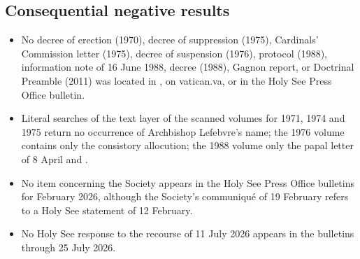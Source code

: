 \subsection*{Consequential negative results}

\begin{itemize}
\item No decree of erection (1970), decree of suppression (1975),
Cardinals' Commission letter (1975), decree of suspension (1976),
protocol (1988), information note of 16 June 1988, decree  (1988), Gagnon report, or Doctrinal Preamble (2011)
was located in , on vatican.va, or in the
Holy See Press Office bulletin.
\item Literal searches of the text layer of the scanned 
volumes for 1971, 1974 and 1975 return no occurrence of Archbishop
Lefebvre's name; the 1976 volume contains only the consistory allocution;
the 1988 volume only the papal letter of 8 April and .
\item No item concerning the Society appears in the Holy See Press Office
bulletins for February 2026, although the Society's communiqué of
19 February refers to a Holy See statement of 12 February.
\item No Holy See response to the recourse of 11 July 2026 appears in the
bulletins through 25 July 2026.
\end{itemize}

